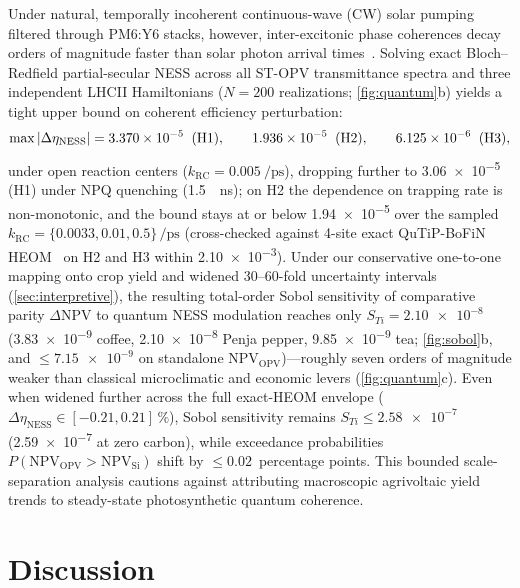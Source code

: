 \documentclass[preprint,12pt,a4paper]{elsarticle}
\begin{document}
Under natural, temporally incoherent continuous-wave (CW) solar pumping filtered through PM6:Y6 stacks, however, inter-excitonic phase coherences decay orders of magnitude faster than solar photon arrival times~\cite{BrumerShapiro2012,Kassal2013}. Solving exact Bloch--Redfield partial-secular NESS across all ST-OPV transmittance spectra and three independent LHCII Hamiltonians ($N = \num{200}$ realizations; \cref{fig:quantum}b) yields a tight upper bound on coherent efficiency perturbation:
\begin{equation}
 \max \abs{\Delta\eta_{\mathrm{NESS}}} = \num{3.370e-5}\;\;(\mathrm{H1}), \qquad \num{1.936e-5}\;\;(\mathrm{H2}), \qquad \num{6.125e-6}\;\;(\mathrm{H3}),
 \label{eq:ness_bound}
\end{equation}
under open reaction centers ($k_{\mathrm{RC}} = \qty{0.005}{\per\pico\second}$), dropping further to \num{3.06e-5} (H1) under NPQ quenching (\qty{1.5}{\per\nano\second}); on H2 the dependence on trapping rate is non-monotonic, and the bound stays at or below \num{1.94e-5} over the sampled $k_{\mathrm{RC}}=\{0.0033, 0.01, 0.5\}\,\unit{\per\pico\second}$ (cross-checked against 4-site exact QuTiP-BoFiN HEOM~\cite{Lambert2023} on H2 and H3 within \num{2.10e-3}). Under our conservative one-to-one mapping onto crop yield and widened 30--60-fold uncertainty intervals (\cref{sec:interpretive}), the resulting total-order Sobol sensitivity of comparative parity $\Delta\mathrm{NPV}$ to quantum NESS modulation reaches only $S_{Ti} = \num{2.10e-8}$ (\num{3.83e-9} coffee, \num{2.10e-8} Penja pepper, \num{9.85e-9} tea; \cref{fig:sobol}b, and $\le \num{7.15e-9}$ on standalone $\mathrm{NPV}_{\mathrm{OPV}}$)---roughly seven orders of magnitude weaker than classical microclimatic and economic levers (\cref{fig:quantum}c). Even when widened further across the full exact-HEOM envelope ($\Delta\eta_{\mathrm{NESS}} \in [\num{-0.21}, \num{+0.21}]\,\unit{\percent}$), Sobol sensitivity remains $S_{Ti} \le \num{2.58e-7}$ (\num{2.59e-7} at zero carbon), while exceedance probabilities $P(\mathrm{NPV}_{\mathrm{OPV}} > \mathrm{NPV}_{\mathrm{Si}})$ shift by $\le \num{0.02}$~percentage points. This bounded scale-separation analysis cautions against attributing macroscopic agrivoltaic yield trends to steady-state photosynthetic quantum coherence.

\section{Discussion}
\label{sec:discussion}
\end{document}
